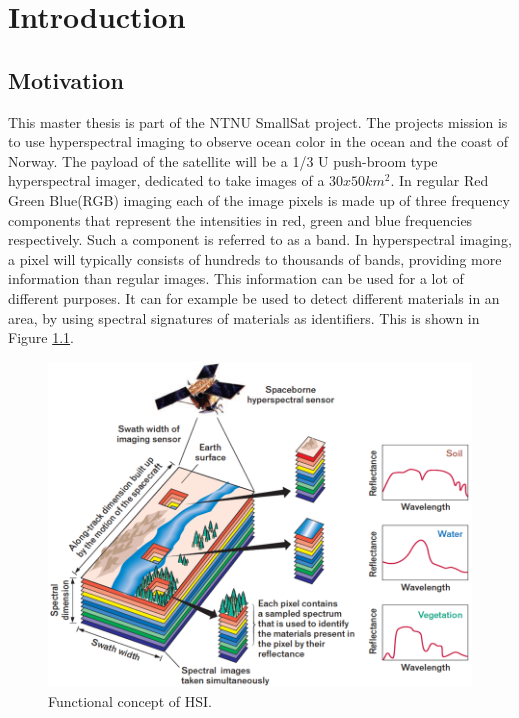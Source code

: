 \newpage
\chapter{Introduction}
\label{sec:introduction}
\section{Motivation}

This master thesis is part of the NTNU SmallSat \cite{SmallSat_project_description} project. The projects mission is to use hyperspectral imaging to observe ocean color in the ocean and the coast of Norway. The payload of the satellite will be a 1/3 U push-broom type hyperspectral imager, dedicated to take images of a $30x50 km^2$. In regular Red Green Blue(RGB) imaging each of the image pixels is made up of three frequency components that represent the intensities in red, green and blue frequencies respectively. Such a component is referred to as a band. In hyperspectral imaging, a pixel will typically consists of hundreds to thousands of bands, providing more information than regular images. This information can be used for a lot of different purposes. It can for example be used to detect different materials in an area, by using spectral signatures of materials as identifiers. This is shown in Figure \ref{fig:HSI_concept}.\\

\begin{figure}[H]
\centering
   \includegraphics[scale=0.3]{images/Imaging-Spectroscopy-Concept.png}
  \caption{ Functional concept of HSI.\cite{HSI_concept} } 
  \label{fig:HSI_concept}
\end{figure}

